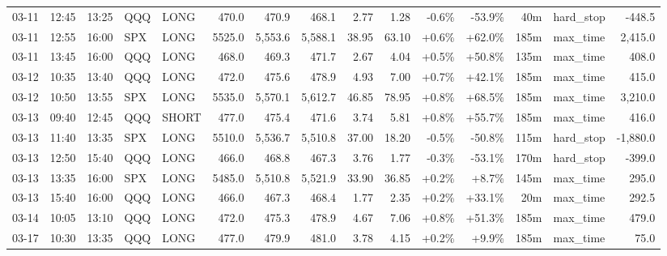 \documentclass[11pt,a4paper,twoside]{article}
\begin{document}
\begin{landscape}
\begin{center}
\begin{longtable}{>{\color{txtmain}}l l l l l r r r r r r r r >{\color{txtmain}}l r}
03-11 & 12:45 & 13:25 & QQQ & LONG & 470.0 & 470.9 & 468.1 & 2.77 & 1.28 & \textcolor{lossred}{-0.6\%} & \textcolor{lossred}{-53.9\%} & 40m & hard\_stop & \textcolor{lossred}{-448.5} \\
03-11 & 12:55 & 16:00 & SPX & LONG & 5525.0 & 5,553.6 & 5,588.1 & 38.95 & 63.10 & \textcolor{wingreen}{+0.6\%} & \textcolor{wingreen}{+62.0\%} & 185m & max\_time & \textcolor{wingreen}{2,415.0} \\
03-11 & 13:45 & 16:00 & QQQ & LONG & 468.0 & 469.3 & 471.7 & 2.67 & 4.04 & \textcolor{wingreen}{+0.5\%} & \textcolor{wingreen}{+50.8\%} & 135m & max\_time & \textcolor{wingreen}{408.0} \\
03-12 & 10:35 & 13:40 & QQQ & LONG & 472.0 & 475.6 & 478.9 & 4.93 & 7.00 & \textcolor{wingreen}{+0.7\%} & \textcolor{wingreen}{+42.1\%} & 185m & max\_time & \textcolor{wingreen}{415.0} \\
03-12 & 10:50 & 13:55 & SPX & LONG & 5535.0 & 5,570.1 & 5,612.7 & 46.85 & 78.95 & \textcolor{wingreen}{+0.8\%} & \textcolor{wingreen}{+68.5\%} & 185m & max\_time & \textcolor{wingreen}{3,210.0} \\
03-13 & 09:40 & 12:45 & QQQ & SHORT & 477.0 & 475.4 & 471.6 & 3.74 & 5.81 & \textcolor{wingreen}{+0.8\%} & \textcolor{wingreen}{+55.7\%} & 185m & max\_time & \textcolor{wingreen}{416.0} \\
03-13 & 11:40 & 13:35 & SPX & LONG & 5510.0 & 5,536.7 & 5,510.8 & 37.00 & 18.20 & \textcolor{lossred}{-0.5\%} & \textcolor{lossred}{-50.8\%} & 115m & hard\_stop & \textcolor{lossred}{-1,880.0} \\
03-13 & 12:50 & 15:40 & QQQ & LONG & 466.0 & 468.8 & 467.3 & 3.76 & 1.77 & \textcolor{lossred}{-0.3\%} & \textcolor{lossred}{-53.1\%} & 170m & hard\_stop & \textcolor{lossred}{-399.0} \\
03-13 & 13:35 & 16:00 & SPX & LONG & 5485.0 & 5,510.8 & 5,521.9 & 33.90 & 36.85 & \textcolor{wingreen}{+0.2\%} & \textcolor{wingreen}{+8.7\%} & 145m & max\_time & \textcolor{wingreen}{295.0} \\
03-13 & 15:40 & 16:00 & QQQ & LONG & 466.0 & 467.3 & 468.4 & 1.77 & 2.35 & \textcolor{wingreen}{+0.2\%} & \textcolor{wingreen}{+33.1\%} & 20m & max\_time & \textcolor{wingreen}{292.5} \\
03-14 & 10:05 & 13:10 & QQQ & LONG & 472.0 & 475.3 & 478.9 & 4.67 & 7.06 & \textcolor{wingreen}{+0.8\%} & \textcolor{wingreen}{+51.3\%} & 185m & max\_time & \textcolor{wingreen}{479.0} \\
03-17 & 10:30 & 13:35 & QQQ & LONG & 477.0 & 479.9 & 481.0 & 3.78 & 4.15 & \textcolor{wingreen}{+0.2\%} & \textcolor{wingreen}{+9.9\%} & 185m & max\_time & \textcolor{wingreen}{75.0} \\

\end{longtable}
\end{center}
\end{landscape}
\end{document}

